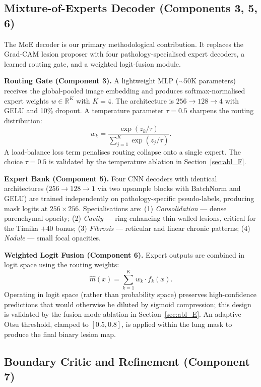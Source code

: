 \documentclass{article}
\begin{document}
\subsection{Mixture-of-Experts Decoder (Components 3, 5, 6)}
\label{sec:moe}

The MoE decoder is our primary methodological contribution. It replaces the Grad-CAM lesion proposer with four pathology-specialised expert decoders, a learned routing gate, and a weighted logit-fusion module.

\textbf{Routing Gate (Component 3).} A lightweight MLP ($\sim$50K parameters) receives the global-pooled image embedding and produces softmax-normalised expert weights $w \in \mathbb{R}^K$ with $K=4$. The architecture is $256{\rightarrow}128{\rightarrow}4$ with GELU and 10\% dropout. A temperature parameter $\tau=0.5$ sharpens the routing distribution:
\begin{equation}
w_k = \frac{\exp(z_k / \tau)}{\sum_{j=1}^{K} \exp(z_j / \tau)}.
\label{eq:routing}
\end{equation}
A load-balance loss term penalises routing collapse onto a single expert. The choice $\tau = 0.5$ is validated by the temperature ablation in Section~\ref{sec:abl_F}.

\textbf{Expert Bank (Component 5).} Four CNN decoders with identical architectures ($256{\rightarrow}128{\rightarrow}1$ via two upsample blocks with BatchNorm and GELU) are trained independently on pathology-specific pseudo-labels, producing mask logits at $256{\times}256$. Specialisations are: (1) \emph{Consolidation} --- dense parenchymal opacity; (2) \emph{Cavity} --- ring-enhancing thin-walled lesions, critical for the Timika $+40$ bonus; (3) \emph{Fibrosis} --- reticular and linear chronic patterns; (4) \emph{Nodule} --- small focal opacities.

\textbf{Weighted Logit Fusion (Component 6).} Expert outputs are combined in logit space using the routing weights:
\begin{equation}
\hat{m}(x) = \sum_{k=1}^{K} w_k \cdot f_k(x).
\label{eq:fusion}
\end{equation}
Operating in logit space (rather than probability space) preserves high-confidence predictions that would otherwise be diluted by sigmoid compression; this design is validated by the fusion-mode ablation in Section~\ref{sec:abl_E}. An adaptive Otsu threshold, clamped to $[0.5, 0.8]$, is applied within the lung mask to produce the final binary lesion map.

\subsection{Boundary Critic and Refinement (Component 7)}
\end{document}

